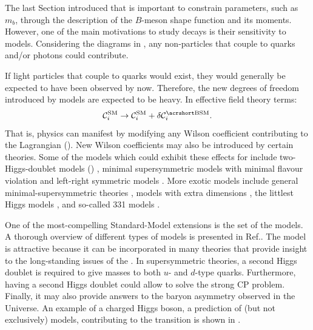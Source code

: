 The last Section introduced that \BtoXsgamma is important to constrain \SM parameters, 
such as $m_b$, through the description of the $B$-meson shape function and its moments.
However, one of the main motivations to study \BtoXsgamma decays is their sensitivity to \BSM models.
Considering the \SM diagrams in , any non-\SM particles that couple to quarks and/or photons could contribute.

If light particles that couple to quarks would exist, they would generally be expected to have been observed by now.
Therefore, the new degrees of freedom introduced by \BSM models are expected to be heavy.
In effective field theory terms:
\begin{equation}\label{eq:corr_wilson}
    \mathcal{C}_i^{\mathrm{SM}} \ra \mathcal{C}_i^{\mathrm{SM}} + \delta\mathcal{C}_i^{\mathrm{\BSM}}.
\end{equation}
That is, \BSM physics can manifest by modifying any Wilson coefficient contributing to the \btosgamma Lagrangian ().
New Wilson coefficients may also be introduced by certain theories.
Some of the models which could exhibit these effects for \BtoXsgamma include 
two-Higgs-doublet models (\TwoHDM) \cite{Borzumati:1998tg,Bobeth:1999ww,Hermann:2012fc}, 
minimal supersymmetric models with minimal flavour violation \cite{Bobeth:1999ww,Borzumati:2003rr,Degrassi:2006eh,Freitas:2007dp}
and left-right symmetric models \cite{Bobeth:1999ww}.
More exotic models include 
general minimal-supersymmetric theories \cite{Ciuchini:2007ha},
models with extra dimensions \cite{Buras:2003mk,Agashe:2004cp,Haisch:2007vb,Freitas:2008vh},
the littlest Higgs models \cite{Buras:2006wk,Blanke:2006sb},
and so-called 331 models \cite{Promberger:2008xg}.

One of the most-compelling Standard-Model extensions is the set of the \TwoHDM models.
A thorough overview of different types of \TwoHDM models is presented in Ref.\cite{Branco:2011iw}.
The model is attractive because it can be incorporated in many theories that provide insight to the long-standing issues of the \SM.
In supersymmetric theories, a second Higgs doublet is required to give masses to both $u$- and $d$-type quarks.
Furthermore, having a second Higgs doublet could allow to solve the strong CP problem.
Finally, it may also provide answers to the baryon asymmetry observed in the Universe.
An example of a charged Higgs boson, a prediction of (but not exclusively) \TwoHDM models, contributing to the \btosgamma transition is shown in .

